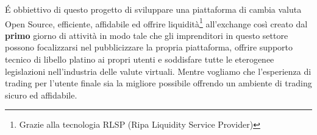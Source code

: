 \documentclass[11pt,fleqn,oneside]{book} %
\begin{document}
É obbiettivo di questo progetto di sviluppare una piattaforma di cambia valuta Open Source, efficiente, affidabile ed 
offrire liquidità\footnote{Grazie alla tecnologia RLSP (Ripa Liquidity Service Provider)} all'exchange così creato dal \textbf{primo}
giorno di attività in modo tale che gli imprenditori in questo settore possono focalizzarsi nel pubblicizzare la propria piattaforma,
offrire supporto tecnico di libello platino ai propri utenti e soddisfare tutte le eterogenee legislazioni nell'industria delle valute virtuali.
Mentre vogliamo che l'esperienza di trading per l'utente finale sia la migliore possibile offrendo un ambiente di trading sicuro ed affidabile.\\
\usechapterimagetrue



\renewcommand*\contentsname{Indice dei Contenuti}
\tableofcontents %








\end{document}
